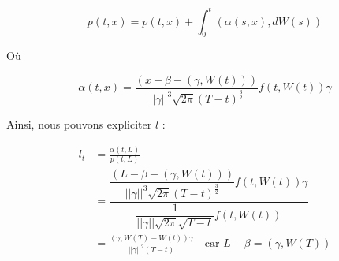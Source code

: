 \documentclass[../finalreport.tex]{subfiles}
\begin{document}
\begin{displaymath}
p \left( t, x \right) = p \left( t, x \right) + \int_0^t \left( \alpha \left(s, x \right), dW \left( s \right) \right)
\end{displaymath}

\par Où

\begin{displaymath}
\alpha \left( t, x \right) = \frac{\left( x - \beta - \left( \gamma, W \left( t \right) \right) \right)}{||\gamma||^3 \sqrt{2 \pi} \left( T - t \right)^{\frac{3}{2}}} f \left( t, W \left( t \right) \right) \gamma
\end{displaymath}

\par Ainsi, nous pouvons expliciter $l$ : 

\begin{displaymath}
	\begin{split}
	l_t &= \frac{\alpha \left(t, L \right)}{p \left(t, L \right)} \\
	&= \dfrac{\dfrac{\left( L - \beta - \left( \gamma, W \left( t \right) \right) \right)}{||\gamma||^3 \sqrt{2 \pi} \left( T - t \right)^{\frac{3}{2}}} f \left( t, W \left( t \right) \right) \gamma}{\dfrac{1}{ ||\gamma|| \sqrt{2 \pi} \sqrt{T - t}}f \left( t, W \left( t \right) \right)} \\
	&= \frac{\left( \gamma, W \left( T \right) - W \left( t \right) \right) \gamma}{||\gamma||^2 \left( T - t \right)} \quad \text{car } L - \beta = \left( \gamma, W \left( T \right) \right)
	\end{split}
\end{displaymath}

\par 
\end{document}
